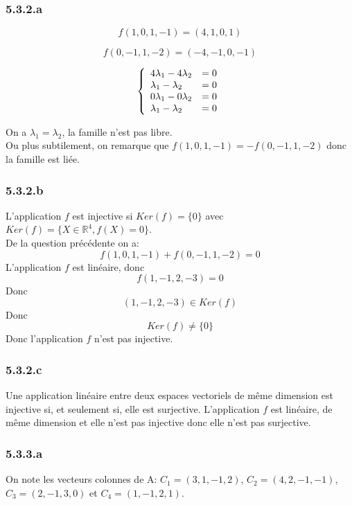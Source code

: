 \documentclass[]{book}
\theoremstyle{definition}
\newcommand{\bb}[1]{\mathbb{#1}}
\newcommand{\R}{\bb{R}}
\begin{document}
\subsubsection*{5.3.2.a}	

$$
f(1,0,1,-1) = (4, 1, 0, 1) 
$$

$$
f(0,-1,1,-2) = (-4, -1, 0, -1) 
$$

$$
\left\{ 
\begin{array}{l l}
4\lambda_1 - 4\lambda_2 & = 0 \\
\lambda_1 - \lambda_2 & = 0\\
0\lambda_1 - 0\lambda_2 & = 0 \\
\lambda_1 - \lambda_2 & = 0 \\
\end{array}
\right. 
$$

On a $\lambda_1 = \lambda_2$, la famille n'est pas libre.\\

Ou plus subtilement, on remarque que $f(1,0,1,-1) = -f(0,-1,1,-2)$ donc la famille est li\'ee.

\subsubsection*{5.3.2.b}	
L'application $f$ est injective si $Ker(f) = \{0\}$ avec $Ker(f) = \{X \in \R^4, f(X) = 0\}$.\\
De la question pr\'ec\'edente on a:
$$
f(1,0,1,-1) + f(0,-1,1,-2) = 0
$$
L'application $f$ est lin\'eaire, donc\\
$$
f(1,-1,2,-3) = 0
$$
Donc
$$
(1,-1,2,-3) \in Ker(f)
$$
Donc
$$
Ker(f) \neq \{0\}
$$
Donc l'application $f$ n'est pas injective.

\subsubsection*{5.3.2.c}	
Une application lin\'eaire entre deux espaces vectoriels de m\^eme dimension est injective si, et seulement si, elle est surjective. L'application $f$ est lin\'eaire, de m\^eme dimension et elle n'est pas injective donc elle n'est pas surjective.

\subsubsection*{5.3.3.a}	
On note les vecteurs colonnes de A: $C_1 = (3,1,-1,2)$, $C_2 = (4,2,-1,-1)$, $C_3 = (2,-1,3,0)$ et $C_4 = (1,-1,2,1)$. \\
\end{document}
